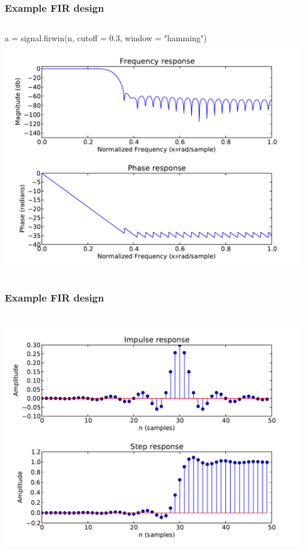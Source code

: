 \documentclass[10pt,colorlinks]{beamer}
\begin{document}
\begin{frame}[fragile]\frametitle{Example FIR design}


\begin{columns}
    
a = signal.firwin(n, cutoff = 0.3, window = "hamming")
\includegraphics[width=\textwidth]{plwfigis/CursP_3_mf1}


\end{columns}
\end{frame}

\begin{frame}[fragile]\frametitle{Example FIR design}

\begin{columns}
\includegraphics[width=\textwidth]{plwfigis/CursP_3_figure63}

\end{columns}
\end{frame}
\end{document}
